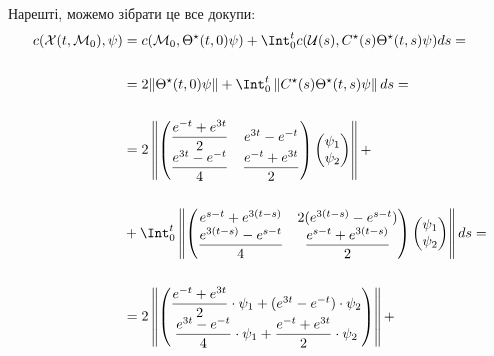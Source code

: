 \begin{solution}
    Нарешті, можемо зібрати це все докупи: 
    \begin{align*}
        c(\mathcal{X}(t, \mathcal{M}_0), \psi) &= c(\mathcal{M}_0, \Theta^\star(t, 0) \psi) + \Int_{0}^t c(\mathcal{U}(s), C^\star(s) \Theta^\star(t, s)\psi) ds = \\
        \\
        &= 2 \|\Theta^\star(t, 0) \psi\| + \Int_{0}^t \left\|C^\star(s) \Theta^\star(t, s)\psi\right\| ds = \\
        \\
        &= 2 \left\|\begin{pmatrix} \dfrac{e^{-t} + e^{3t}}{2} & e^{3t} - e^{-t} \\ \dfrac{e^{3t} - e^{-t}}{4} & \dfrac{e^{-t} + e^{3t}}{2} \end{pmatrix} \begin{pmatrix} \psi_1 \\ \psi_2 \end{pmatrix}\right\| + \\
        \\
        &+ \Int_{0}^t \left\|\begin{pmatrix} e^{s-t} + e^{3(t-s)} & 2(e^{3(t-s)} - e^{s-t}) \\ \dfrac{e^{3(t-s)} - e^{s-t}}{4} & \dfrac{e^{s-t} + e^{3(t-s)}}{2} \end{pmatrix} \begin{pmatrix} \psi_1 \\ \psi_2 \end{pmatrix}\right\| ds = \\
        \\
        &= 2 \left\| \begin{pmatrix} \dfrac{e^{-t} + e^{3t}}{2} \cdot \psi_1 + (e^{3t} - e^{-t}) \cdot \psi_2 \\ \dfrac{e^{3t} - e^{-t}}{4}\cdot\psi_1 + \dfrac{e^{-t} + e^{3t}}{2}\cdot\psi_2 \end{pmatrix} \right\| + \\
    \end{align*}
    
\end{solution} 